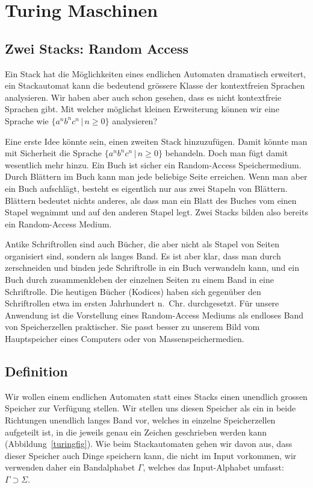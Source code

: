 %
%
%

\section{Turing Maschinen}
\subsection{Zwei Stacks: Random Access}
Ein Stack hat die Möglichkeiten eines endlichen Automaten dramatisch
erweitert, ein Stackautomat kann die bedeutend grössere Klasse der
kontextfreien Sprachen analysieren. Wir haben aber auch schon gesehen,
dass es nicht kontextfreie Sprachen gibt. Mit welcher möglichst kleinen
Erweiterung können wir eine Sprache wie $\{a^nb^nc^n\,|\, n\ge 0\}$
analysieren?

Eine erste Idee könnte sein, einen zweiten Stack hinzuzufügen.
Damit könnte man mit Sicherheit die Sprache $\{a^nb^nc^n\,|\,n\ge 0\}$
behandeln. Doch man fügt damit wesentlich mehr hinzu. Ein Buch ist
sicher ein Random-Access Speichermedium. Durch Blättern im Buch
kann man jede beliebige Seite erreichen. Wenn man aber ein Buch
aufschlägt, besteht es eigentlich nur aus zwei Stapeln von Blättern.
Blättern bedeutet nichts anderes, als dass man ein Blatt des Buches vom
einen Stapel wegnimmt und auf den anderen Stapel legt. Zwei Stacks
bilden also bereits ein Random-Access Medium.

Antike Schriftrollen sind auch Bücher, die aber nicht als Stapel
von Seiten organisiert sind, sondern als langes Band. Es ist aber klar,
dass man durch zerschneiden und binden jede Schriftrolle in ein
Buch verwandeln kann, und ein Buch durch zusammenkleben der einzelnen
Seiten zu einem Band in eine Schriftrolle.
Die heutigen Bücher (Kodices) haben sich gegenüber den Schriftrollen
etwa im ersten Jahrhundert n.~Chr. durchgesetzt.
Für unsere Anwendung ist die Vorstellung eines Random-Access Mediums
als endloses Band von Speicherzellen praktischer. Sie passt besser zu
unserem Bild vom Hauptspeicher eines Computers oder von Massenspeichermedien.
\subsection{Definition}
%
%
%
Wir wollen einem endlichen Automaten statt eines Stacks einen unendlich
grossen Speicher zur Verfügung stellen. Wir stellen uns diesen
Speicher als ein in beide Richtungen unendlich langes Band vor,
welches in einzelne Speicherzellen aufgeteilt ist, in die jeweils
genau ein Zeichen geschrieben werden kann (Abbildung~\ref{turingfig}).
Wie beim Stackautomaten gehen
wir davon aus, dass dieser Speicher auch Dinge speichern kann, die nicht
im Input vorkommen, wir verwenden daher ein Bandalphabet $\Gamma$, welches
das Input-Alphabet umfasst: $\Gamma\supset \Sigma$.


